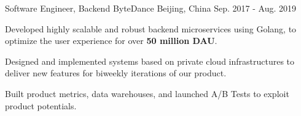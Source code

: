 
\begin{cventries}

  \cventry
    {Software Engineer, Backend} %
    {ByteDance} %
    {Beijing, China} %
    {Sep. 2017 - Aug. 2019} %
    {
      \begin{cvitems} 
        \item{Developed highly scalable and robust backend microservices using Golang, to optimize the user experience for over \textbf{50 million DAU}.}
        \item {Designed and implemented systems based on private cloud infrastructures to deliver new features for biweekly iterations of our product.}  
        \item {Built product metrics, data warehouses, and launched A/B Tests to exploit product potentials.}
      \end{cvitems}
    }


\end{cventries}
